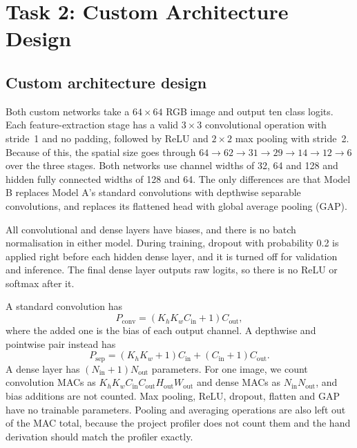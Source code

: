 \documentclass[11pt]{article}
\title{}
\date{}
\begin{document}
\setcounter{section}{1}
\clearpage
\section{Task 2: Custom Architecture Design}
\label{sec:task2}
\subsection{Custom architecture design}
\label{sec:custom-architecture}

Both custom networks take a $64\times64$ RGB image and output ten class
logits.  Each feature-extraction stage has a valid $3\times3$ convolutional
operation with stride~1 and no padding, followed by ReLU and $2\times2$ max
pooling with stride~2.  Because of this, the spatial size goes through
$64\rightarrow62\rightarrow31\rightarrow29\rightarrow14\rightarrow12
\rightarrow6$ over the three stages.  Both networks use channel widths of 32,
64 and 128 and hidden fully connected widths of 128 and 64.  The only
differences are that Model B replaces Model A's standard convolutions with
depthwise separable convolutions, and replaces its flattened head with global
average pooling (GAP).

All convolutional and dense layers have biases, and there is no batch
normalisation in either model.  During training, dropout with probability 0.2
is applied right before each hidden dense layer, and it is turned off for
validation and inference.  The final dense layer outputs raw logits, so there
is no ReLU or softmax after it.

A standard convolution has
\begin{equation}
  P_{\mathrm{conv}}=(K_hK_wC_{\mathrm{in}}+1)C_{\mathrm{out}},
\end{equation}
where the added one is the bias of each output channel.  A depthwise and
pointwise pair instead has
\begin{equation}
  P_{\mathrm{sep}}=(K_hK_w+1)C_{\mathrm{in}}
  +(C_{\mathrm{in}}+1)C_{\mathrm{out}}.
\end{equation}
A dense layer has $(N_{\mathrm{in}}+1)N_{\mathrm{out}}$ parameters.  For one
image, we count convolution MACs as
$K_hK_wC_{\mathrm{in}}C_{\mathrm{out}}H_{\mathrm{out}}W_{\mathrm{out}}$
and dense MACs as $N_{\mathrm{in}}N_{\mathrm{out}}$, and bias additions are
not counted.  Max pooling, ReLU, dropout, flatten and GAP have no trainable
parameters.  Pooling and averaging operations are also left out of the MAC
total, because the project profiler does not count them and the hand
derivation should match the profiler exactly.
\end{document}
